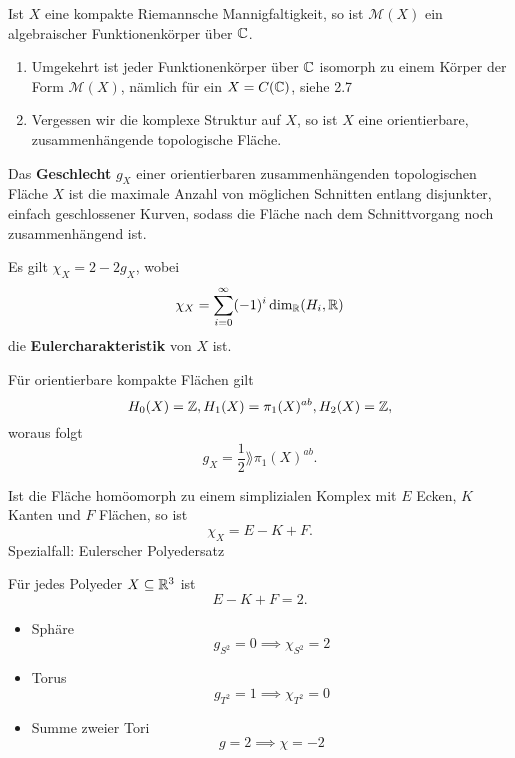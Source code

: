 \begin{theorem}
    Ist $X$ eine kompakte Riemannsche Mannigfaltigkeit, so ist $\mathcal{M}(X)$ ein algebraischer Funktionenkörper über $\mathbb{C}$.
\end{theorem}

\begin{bemerkungnr}
    \begin{enumerate}[label=\alph*.)]
        \item Umgekehrt ist jeder Funktionenkörper über $\mathbb{C}$ isomorph zu einem Körper der Form $\mathcal{M}(X)$,
        nämlich für ein $X = C(\mathbb{C})$, siehe 2.7
        \item Vergessen wir die komplexe Struktur auf $X$, so ist $X$ eine orientierbare, zusammenhängende topologische Fläche.
    \end{enumerate}
\end{bemerkungnr}

\begin{definition}
    Das \textbf{Geschlecht} $g_X$ einer orientierbaren zusammenhängenden topologischen Fläche $X$ ist die maximale Anzahl von
    möglichen Schnitten entlang disjunkter, einfach geschlossener Kurven, sodass die Fläche nach dem Schnittvorgang noch zusammenhängend ist.
\end{definition}

\begin{bemerkungnr}
    Es gilt $\chi_X = 2 - 2g_X$, wobei
    $$ \chi_X = \sum\limits_{i=0}^\infty (-1)^i \dim_{\mathbb{R}} (H_i, \mathbb{R})$$
    die \textbf{Eulercharakteristik} von $X$ ist.

    Für orientierbare kompakte Flächen gilt 
    $$H_0(X) = \mathbb{Z}, H_1(X) = \pi_1(X)^{ab}, H_2(X) = \mathbb{Z},$$
    woraus folgt
    $$ g_X = \frac{1}{2} \rang \pi_1(X)^{ab}.$$
\end{bemerkungnr}

\begin{beispiel}
    Ist die Fläche homöomorph zu einem simplizialen Komplex mit $E$ Ecken, $K$ Kanten und $F$ Flächen,
    so ist
    $$ \chi_X = E - K + F.$$
    Spezialfall: Eulerscher Polyedersatz

    Für jedes Polyeder $X \subseteq \mathbb{R}^3$ ist 
    $$ E - K + F = 2.$$
\end{beispiel}

\begin{beispiel}
    \begin{itemize}
        \item Sphäre
        $$g_{S^2} = 0 \implies \chi_{S^2} = 2 $$

        \item Torus
        $$g_{T^2} = 1 \implies \chi_{T^2} = 0 $$

        \item Summe zweier Tori
        $$ g = 2 \implies \chi = -2$$
    \end{itemize}
\end{beispiel}

